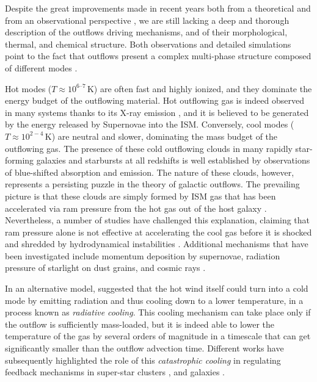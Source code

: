 \documentclass[12pt]{article}
\begin{document}
Despite the great improvements made in recent years both from a theoretical and from an observational perspective \citep{veilleux2020cool}, we are still lacking a deep and thorough description of the outflows driving mechanisms, and of their morphological, thermal, and chemical structure. Both observations and detailed simulations point to the fact that outflows present a complex multi-phase structure composed of different modes \citep{murray2011, hopkins2014, muratov2015}. 

Hot modes ($T \approx 10^{6–7} \,\mathrm{K}$) are often fast and highly ionized, and they dominate the energy budget of the outflowing material. Hot outflowing gas is indeed observed in many systems thanks to its X-ray emission \citep{griffiths2000hot, strickland2009supernova}, and it is believed to be generated by the energy released by Supernovae into the ISM. Conversely, cool modes ($T \approx 10^{2-4} \,\mathrm{K}$) are neutral and slower, dominating the mass budget of the outflowing gas. The presence of these cold outflowing clouds in many rapidly star-forming galaxies and starbursts at all redshifts is well established by observations of blue-shifted absorption and emission. The nature of these clouds, however, represents a persisting puzzle in the theory of galactic outflows. The prevailing picture is that these clouds are simply formed by ISM gas that has been accelerated via ram pressure from the hot gas out of the host galaxy \citep[e.g.,][]{Veilleux:2005ia}. Nevertheless, a number of studies have challenged this explanation, claiming that ram pressure alone is not effective at accelerating the cool gas before it is shocked and shredded by hydrodynamical instabilities \citep{scannapieco2015launching, zhang2017entrainment}. Additional mechanisms that have been investigated include momentum deposition by supernovae, radiation pressure of starlight on dust grains, and cosmic rays \citep{Thompson:2015dynamics, quataert2021physics}. 

In an alternative model, \citet{Thompson16} suggested \citep[elaborating on earlier work by e.g.,][]{Wang:1995, Silich:2004} that the hot wind itself could turn into a cold mode by emitting radiation and thus cooling down to a lower temperature, in a process known as \textit{radiative cooling}. This cooling mechanism can take place only if the outflow is sufficiently mass-loaded, but it is indeed able to lower the temperature of the gas by several orders of magnitude in a timescale that can get significantly smaller than the outflow advection time. Different works have subsequently highlighted the role of this \textit{catastrophic cooling} in regulating feedback mechanisms in super-star clusters \citep{gray2019catastrophic}, and galaxies \citep{Schneider:2018, Gronke&Oh:2020}. 
\end{document}
